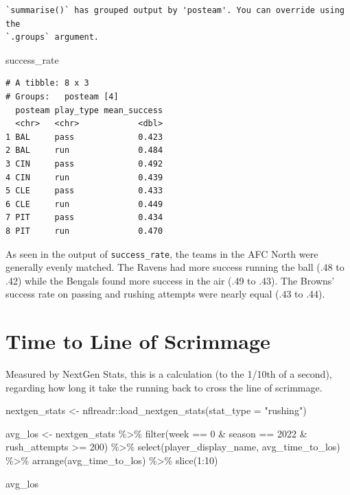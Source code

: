 \documentclass[
  letterpaper,
]{krantz}
\newenvironment{Shaded}{\begin{snugshade}}{\end{snugshade}}
\newcommand{\AttributeTok}[1]{\textcolor[rgb]{0.40,0.45,0.13}{#1}}
\newcommand{\DecValTok}[1]{\textcolor[rgb]{0.68,0.00,0.00}{#1}}
\newcommand{\FunctionTok}[1]{\textcolor[rgb]{0.28,0.35,0.67}{#1}}
\newcommand{\NormalTok}[1]{\textcolor[rgb]{0.00,0.23,0.31}{#1}}
\newcommand{\OtherTok}[1]{\textcolor[rgb]{0.00,0.23,0.31}{#1}}
\newcommand{\SpecialCharTok}[1]{\textcolor[rgb]{0.37,0.37,0.37}{#1}}
\newcommand{\StringTok}[1]{\textcolor[rgb]{0.13,0.47,0.30}{#1}}
\begin{document}
\begin{verbatim}
`summarise()` has grouped output by 'posteam'. You can override using the
`.groups` argument.
\end{verbatim}

\begin{Shaded}
\begin{Highlighting}[]
\NormalTok{success\_rate}
\end{Highlighting}
\end{Shaded}

\begin{verbatim}
# A tibble: 8 x 3
# Groups:   posteam [4]
  posteam play_type mean_success
  <chr>   <chr>            <dbl>
1 BAL     pass             0.423
2 BAL     run              0.484
3 CIN     pass             0.492
4 CIN     run              0.439
5 CLE     pass             0.433
6 CLE     run              0.449
7 PIT     pass             0.434
8 PIT     run              0.470
\end{verbatim}

As seen in the output of \texttt{success\_rate}, the teams in the AFC
North were generally evenly matched. The Ravens had more success running
the ball (.48 to .42) while the Bengals found more success in the air
(.49 to .43). The Browns' success rate on passing and rushing attempts
were nearly equal (.43 to .44).

\hypertarget{time-to-line-of-scrimmage}{%
\section{Time to Line of Scrimmage}\label{time-to-line-of-scrimmage}}

Measured by NextGen Stats, this is a calculation (to the 1/10th of a
second), regarding how long it take the running back to cross the line
of scrimmage.

\begin{Shaded}
\begin{Highlighting}[]
\NormalTok{nextgen\_stats }\OtherTok{\textless{}{-}}\NormalTok{ nflreadr}\SpecialCharTok{::}\FunctionTok{load\_nextgen\_stats}\NormalTok{(}\AttributeTok{stat\_type =} \StringTok{"rushing"}\NormalTok{)}

\NormalTok{avg\_los }\OtherTok{\textless{}{-}}\NormalTok{ nextgen\_stats }\SpecialCharTok{\%\textgreater{}\%}
  \FunctionTok{filter}\NormalTok{(week }\SpecialCharTok{==} \DecValTok{0} \SpecialCharTok{\&}\NormalTok{ season }\SpecialCharTok{==} \DecValTok{2022} \SpecialCharTok{\&}\NormalTok{ rush\_attempts }\SpecialCharTok{\textgreater{}=} \DecValTok{200}\NormalTok{) }\SpecialCharTok{\%\textgreater{}\%}
  \FunctionTok{select}\NormalTok{(player\_display\_name, avg\_time\_to\_los) }\SpecialCharTok{\%\textgreater{}\%}
  \FunctionTok{arrange}\NormalTok{(avg\_time\_to\_los) }\SpecialCharTok{\%\textgreater{}\%}
  \FunctionTok{slice}\NormalTok{(}\DecValTok{1}\SpecialCharTok{:}\DecValTok{10}\NormalTok{)}

\NormalTok{avg\_los}
\end{Highlighting}
\end{Shaded}
\end{document}
